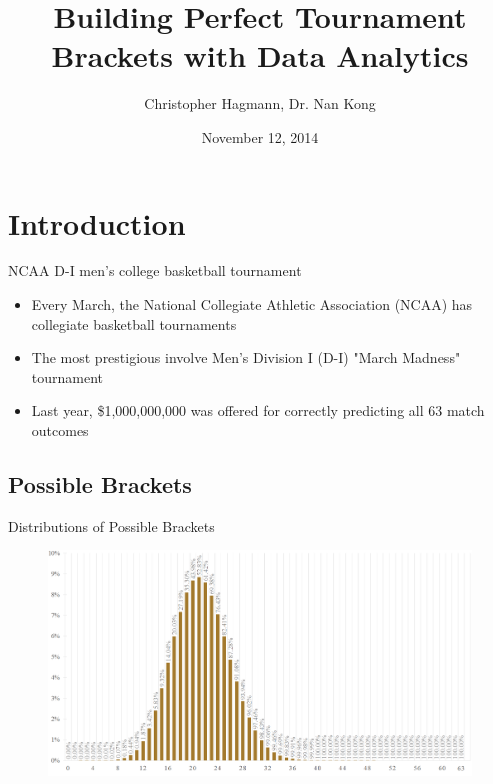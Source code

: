 \documentclass{beamer}
\title[Bracketology - INFORMS 2014]{Building Perfect Tournament Brackets \newline with Data Analytics}
\author[Hagmann]{Christopher Hagmann, Dr. Nan Kong}
\institute[Purdue]{Purdue University}
\date{November 12, 2014}
\begin{document}
\begin{frame}
  \titlepage
\end{frame}





\section{Introduction}

\begin{frame}{NCAA D-I men's college basketball tournament}
\begin{itemize}
\item Every March, the National Collegiate Athletic Association (NCAA) has collegiate basketball tournaments
\item The most prestigious involve Men's Division I (D-I) \newline "March Madness" tournament
\item Last year, \$1,000,000,000 was offered for correctly predicting \newline all 63 match outcomes
\end{itemize}
\end{frame}

\subsection{Possible Brackets}

\begin{frame}{Distributions of Possible Brackets}
 \begin{figure}[!t]
 \centering
 \includegraphics[width=4.75in]{distro.png} 
  \label{distro}
 \end{figure}
\end{frame}
\end{document}
